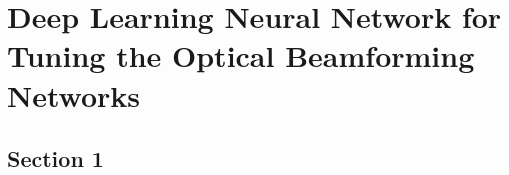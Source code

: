 %
\chapter{Deep Learning Neural Network for Tuning the Optical Beamforming Networks}


\section{Section 1}

